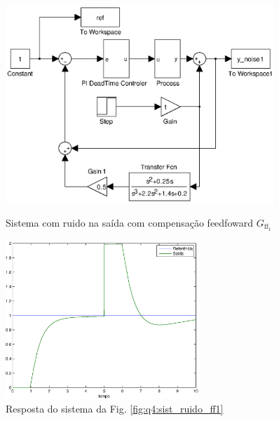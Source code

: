 \begin{figure}[htb]
\centering
\includegraphics[width=0.9\textwidth]{imgs/questao4/sist_ruido_ff1}
\caption{Sistema com ruido na saída com compensação feedfoward $G_{\text{ff}_1}$}
\label{fig:q4:sist_ruido_ff1}
\includegraphics[width=0.65\textwidth]{imgs/questao4/saida_ruido_ff1}
\caption{Resposta do sistema da Fig. \ref{fig:q4:sist_ruido_ff1}}
\label{fig:q4:saida_ruido_ff1}
\end{figure}

